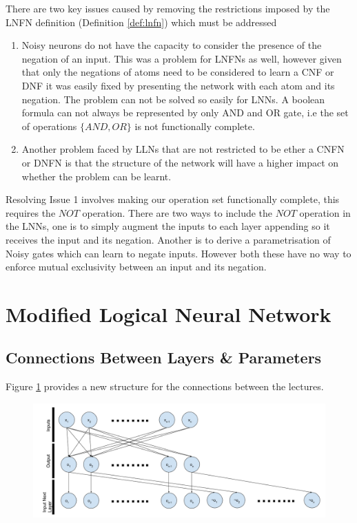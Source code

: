 There are two key issues caused by removing the restrictions imposed by the LNFN definition (Definition \ref{def:lnfn}) which must be addressed 

\begin{enumerate}
	\item Noisy neurons do not have the capacity to consider the presence of the negation of an input. This was a problem for LNFNs as well, however given that only the negations of atoms need to be considered to learn a CNF or DNF it was easily fixed by presenting the network with each atom and its negation. The problem can not be solved so easily for LNNs. A boolean formula can not always be represented by only AND and OR gate, i.e the set of operations $\{AND, OR\}$ is not functionally complete. 
	
	\item Another problem faced by LLNs that are not restricted to be ether a CNFN or DNFN is that the structure of the network will have a higher impact on whether the problem can be learnt. 
\end{enumerate}

Resolving Issue 1 involves making our operation set functionally complete, this requires the $NOT$ operation. There are two ways to include the $NOT$ operation in the LNNs, one is to simply augment the inputs to each layer appending so it receives the input and its negation. Another is to derive a parametrisation of Noisy gates which can learn to negate inputs. However both these have no way to enforce mutual exclusivity between an input and its negation.\\

\section{Modified Logical Neural Network} \label{sec:modified-lnn}
\subsection{Connections Between Layers \& Parameters}
Figure \ref{fig:modified-lnn-structure} provides a new structure for the connections between the lectures.

\begin{figure}[H]
	\centering
	\begin{minipage}[b]{0.9\textwidth}
		\includegraphics[width=\textwidth]{Modified-LNN-Structure.png}
		\caption{}
		\label{fig:modified-lnn-structure}
	\end{minipage}
	\hfill
\end{figure}


